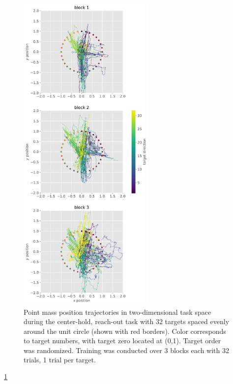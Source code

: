 \documentclass[
  a4paper,
]{article}
\begin{document}
\begin{figure}
\hypertarget{fig:trajectories}{%
\centering
\includegraphics[width=0.6\textwidth,height=\textheight]{images/data_analysis/center_hold/trajectories.pdf}
\caption{Point mass position trajectories in two-dimensional task space
during the center-hold, reach-out task with 32 targets spaced evenly
around the unit circle (shown with red borders). Color corresponds to
target numbers, with target zero located at (0,1). Target order was
randomized. Training was conducted over 3 blocks each with 32 trials, 1
trial per target.}\label{fig:trajectories}
}
\end{figure}

\cref{fig:trajectories}
\end{document}
